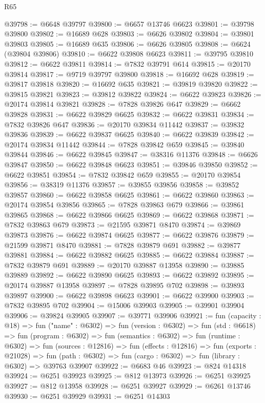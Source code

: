 \begin{lexlean}{R65}
\begin{coremodule}
{@39798 := @6648 @39797
@39800 := @6657 @13746 @6623
@39801 := @39798 @39800
@39802 := @16689 @628
@39803 := @6626 @39802
@39804 := @39801 @39803
@39805 := @16689 @635
@39806 := @6626 @39805
@39808 := @6624 (@39804 @39806)
@39810 := @6622 @39808 @6623
@39811 := @39795 @39810
@39812 := @6622 @39811
@39814 := @7832 @39791 @614
@39815 := @20170 @39814
@39817 := @9719 @39797 @39800
@39818 := @16692 @628
@39819 := @39817 @39818
@39820 := @16692 @635
@39821 := @39819 @39820
@39822 := @39815 @39821
@39823 := @39812 @39822
@39824 := @6622 @39823
@39826 := @20174 @39814 @39821
@39828 := @7828 @39826 @647
@39829 := @6662 @39828
@39831 := @6622 @39829 @6625
@39832 := @6622 @39831
@39834 := @7832 @39826 @647
@39836 := @20170 @39834 @11442
@39837 := @39832 @39836
@39839 := @6622 @39837 @6625
@39840 := @6622 @39839
@39842 := @20174 @39834 @11442
@39844 := @7828 @39842 @659
@39845 := @39840 @39844
@39846 := @6622 @39845
@39847 := @38316 @11376
@39848 := @6626 @39847
@39850 := @6622 @39848 @6623
@39851 := @39846 @39850
@39852 := @6622 @39851
@39854 := @7832 @39842 @659
@39855 := @20170 @39854
@39856 := @38319 @11376
@39857 := @39855 @39856
@39858 := @39852 @39857
@39860 := @6622 @39858 @6625
@39861 := @6622 @39860
@39863 := @20174 @39854 @39856
@39865 := @7828 @39863 @679
@39866 := @39861 @39865
@39868 := @6622 @39866 @6625
@39869 := @6622 @39868
@39871 := @7832 @39863 @679
@39873 := @21595 @39871 @8470
@39874 := @39869 @39873
@39876 := @6622 @39874 @6625
@39877 := @6622 @39876
@39879 := @21599 @39871 @8470
@39881 := @7828 @39879 @691
@39882 := @39877 @39881
@39884 := @6622 @39882 @6625
@39885 := @6622 @39884
@39887 := @7832 @39879 @691
@39889 := @20170 @39887 @13958
@39890 := @39885 @39889
@39892 := @6622 @39890 @6625
@39893 := @6622 @39892
@39895 := @20174 @39887 @13958
@39897 := @7828 @39895 @702
@39898 := @39893 @39897
@39900 := @6622 @39898 @6623
@39901 := @6622 @39900
@39903 := @7832 @39895 @702
@39904 := @15006 @39903
@39905 := @39901 @39904
@39906 := @39824 @39905
@39907 := @39771 @39906
@39921 := fun (capacity : @18) =>
  fun ("name" : @6302) =>
  fun (version : @6302) =>
  fun (std : @6618) =>
  fun (program : @6302) =>
  fun (semantics : @6302) =>
  fun (runtime : @6302) =>
  fun (sources : @12816) =>
  fun (effects : @12816) =>
  fun (exports : @21028) =>
  fun (path : @6302) => fun (cargo : @6302) => fun (library : @6302) => @39763 @39907
@39922 := @6683 @46
@39923 := @824 @14318
@39924 := @6251 @39923
@39925 := @812 @13973
@39926 := @6251 @39925
@39927 := @812 @13958
@39928 := @6251 @39927
@39929 := @6261 @13746
@39930 := @6251 @39929
@39931 := @6251 @14303
}
\end{coremodule}
\end{lexlean}
